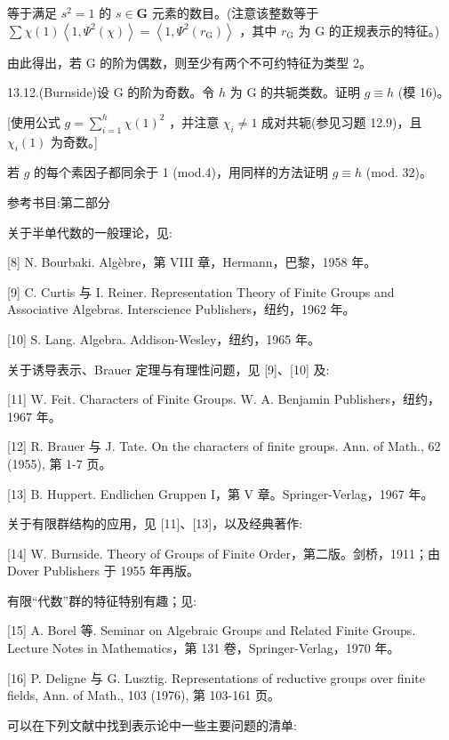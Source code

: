 \documentclass[10pt]{article}
\begin{document}
等于满足 \({s}^{2} = 1\) 的 \(s \in  \mathbf{G}\) 元素的数目。(注意该整数等于 \(\sum \chi \left( 1\right) \left\langle  {1,{\Psi }^{2}\left( \chi \right) }\right\rangle   = \left\langle  {1,{\Psi }^{2}\left( {r}_{\mathrm{G}}\right) }\right\rangle\) ，其中 \({r}_{\mathrm{G}}\) 为 G 的正规表示的特征。)

由此得出，若 G 的阶为偶数，则至少有两个不可约特征为类型 2。

13.12.(Burnside)设 G 的阶为奇数。令 \(h\) 为 G 的共轭类数。证明 \(g \equiv  h\) (模 16)。

[使用公式 \(g = \mathop{\sum }\limits_{{i = 1}}^{h}\chi {\left( 1\right) }^{2}\) ，并注意 \({\chi }_{i} \neq  1\) 成对共轭(参见习题 12.9)，且 \({\chi }_{i}\left( 1\right)\) 为奇数。]

若 \(g\) 的每个素因子都同余于 1 (mod.4)，用同样的方法证明 \(g \equiv  h\) (mod. 32)。

参考书目:第二部分

关于半单代数的一般理论，见:

[8] N. Bourbaki. Algèbre，第 VIII 章，Hermann，巴黎，1958 年。

[9] C. Curtis 与 I. Reiner. Representation Theory of Finite Groups and Associative Algebras. Interscience Publishers，纽约，1962 年。

[10] S. Lang. Algebra. Addison-Wesley，纽约，1965 年。

关于诱导表示、Brauer 定理与有理性问题，见 [9]、[10] 及:

[11] W. Feit. Characters of Finite Groups. W. A. Benjamin Publishers，纽约，1967 年。

[12] R. Brauer 与 J. Tate. On the characters of finite groups. Ann. of Math., 62 (1955), 第 1-7 页。

[13] B. Huppert. Endlichen Gruppen I，第 V 章。Springer-Verlag，1967 年。

关于有限群结构的应用，见 [11]、[13]，以及经典著作:

[14] W. Burnside. Theory of Groups of Finite Order，第二版。剑桥，1911；由 Dover Publishers 于 1955 年再版。

有限“代数”群的特征特别有趣；见:

[15] A. Borel 等. Seminar on Algebraic Groups and Related Finite Groups. Lecture Notes in Mathematics，第 131 卷，Springer-Verlag，1970 年。

[16] P. Deligne 与 G. Lusztig. Representations of reductive groups over finite fields, Ann. of Math., 103 (1976), 第 103-161 页。

可以在下列文献中找到表示论中一些主要问题的清单:
\end{document}
